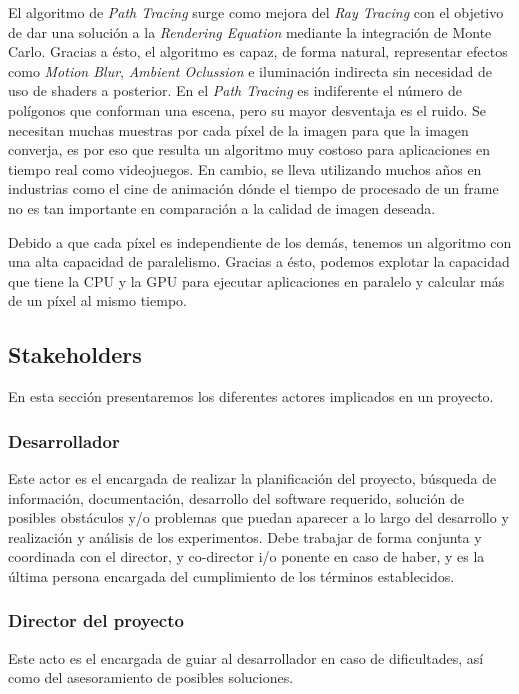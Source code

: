 \documentclass[twoside,a4paper,titlepage,11pt]{report}
\begin{document}
El algoritmo de \textit{Path Tracing} surge como mejora del \textit{Ray Tracing} con el objetivo de dar una solución a la \textit{Rendering Equation} mediante la integración de Monte Carlo. Gracias a ésto, el algoritmo es capaz, de forma natural, representar efectos como \textit{Motion Blur}, \textit{Ambient Oclussion} e iluminación indirecta sin necesidad de uso de shaders a posterior. En el \textit{Path Tracing} es indiferente el número de polígonos que conforman una escena, pero su mayor desventaja es el ruido. Se necesitan muchas muestras por cada píxel de la imagen para que la imagen converja, es por eso que resulta un algoritmo muy costoso para aplicaciones en tiempo real como videojuegos. En cambio, se lleva utilizando muchos años en industrias como el cine de animación dónde el tiempo de procesado de un frame no es tan importante en comparación a la calidad de imagen deseada.

Debido a que cada píxel es independiente de los demás, tenemos un algoritmo con una alta capacidad de paralelismo. Gracias a ésto, podemos explotar la capacidad que tiene la CPU y la GPU para ejecutar aplicaciones en paralelo y calcular más de un píxel al mismo tiempo. 


\subsection{Stakeholders}

En esta sección presentaremos los diferentes actores implicados en un proyecto.

\subsubsection{Desarrollador}

Este actor es el encargada de realizar la planificación del proyecto, búsqueda de información, documentación, desarrollo del software requerido, solución de posibles obstáculos y/o problemas que puedan aparecer a lo largo del desarrollo y realización y análisis de los experimentos. Debe trabajar de forma conjunta y coordinada con el director, y co-director i/o ponente en caso de haber, y es la última persona encargada del cumplimiento de los términos establecidos.

\subsubsection{Director del proyecto}

Este acto es el encargada de guiar al desarrollador en caso de dificultades, así como del asesoramiento de posibles soluciones.
\end{document}
